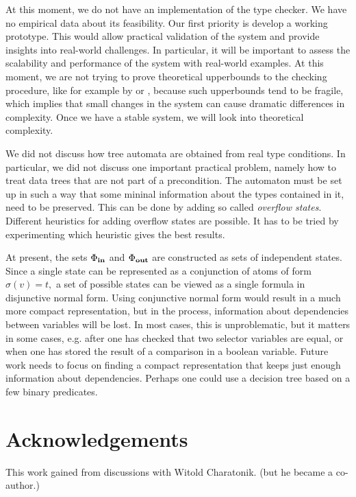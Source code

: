 \documentclass{llncs}
\begin{document}
At this moment, we do not have an implementation of the
type checker. We have no empirical data about its feasibility.
Our first priority is develop a working prototype. 
This would allow practical validation of the system and
provide insights into real-world challenges.
In particular, it will be important to assess the scalability
and performance of the system with real-world examples.
At this moment, we are not trying to prove theoretical upperbounds
to the checking procedure, like for example by 
\cite{AlexanderAikenDexterKozenMosheVardi1994} or \cite{ChaPo2002},
because such upperbounds tend to be
fragile, which implies that small changes in the system can cause
dramatic differences in complexity. Once we have a stable system,
we will look into theoretical complexity.

We did not discuss how tree automata
are obtained from real type conditions. In particular, we did not
discuss one important practical problem, namely how to treat data 
trees that are not part of a precondition. The automaton must
be set up in such a way that some mininal information about the
types contained in it, need to be preserved. This can be done by
adding so called \emph{overflow states}. Different heuristics
for adding overflow states are possible. It has to be tried by
experimenting which heuristic gives the best results.

At present, the sets $ \Phi_{\bf in} $ and $ \Phi_{\bf out} $ are 
constructed as sets of independent states. Since a single state can
be represented as a conjunction of atoms of form
$ \sigma(v) = t, $ a set of possible states can be
viewed as a single formula in disjunctive normal form.
Using conjunctive normal form would result in a much
more compact representation, but in the process, information
about dependencies between variables will be lost. In most cases,
this is unproblematic, but it matters in some cases, e.g.
after one has checked that two selector variables are equal,
or when one has stored the result of a comparison in a boolean variable.
Future work needs to focus on finding a compact representation that
keeps just enough information about dependencies.
Perhaps one could use a decision tree based on a few binary predicates.

\section{Acknowledgements}

This work gained from discussions with Witold Charatonik.
(but he became a co-author.)



\end{document}
